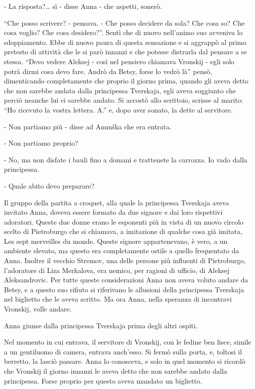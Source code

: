 - La risposta?\ldots{} sì - disse Anna - che aspetti, sonerò. 

``Che posso scrivere? - pensava. - Che posso decidere da sola? Che cosa so? Che cosa voglio? Che cosa desidero?''. Sentì che di nuovo nell'animo suo avveniva lo sdoppiamento. Ebbe di nuovo paura di questa sensazione e si aggrappò al primo pretesto di attività che le si parò innanzi e che potesse distrarla dal pensare a se stessa. ``Devo vedere Aleksej - così nel pensiero chiamava Vronskij - egli solo potrà dirmi cosa devo fare. Andrò da Betsy, forse lo vedrò là'' pensò, dimenticando completamente che proprio il giorno prima, quando gli aveva detto che non sarebbe andata dalla principessa Tverskaja, egli aveva soggiunto che perciò neanche lui ci sarebbe andato. Si accostò allo scrittoio, scrisse al marito: ``Ho ricevuto la vostra lettera. A.'' e, dopo aver sonato, la dette al servitore. 

- Non partiamo più - disse ad Annuška che era entrata. 

- Non partiamo proprio? 

- No, ma non disfate i bauli fino a domani e trattenete la carrozza. Io vado dalla principessa. 

- Quale abito devo preparare? 

\label{xvii-2} 

Il gruppo della partita a croquet, alla quale la principessa Tverskaja aveva invitato Anna, doveva essere formato da due signore e dai loro rispettivi adoratori. Queste due donne erano le esponenti più in vista di un nuovo circolo scelto di Pietroburgo che si chiamava, a imitazione di qualche cosa già imitata, Les sept merveilles du monde. Queste signore appartenevano, è vero, a un ambiente elevato, ma questo era completamente ostile a quello frequentato da Anna. Inoltre il vecchio Stremov, una delle persone più influenti di Pietroburgo, l'adoratore di Liza Merkalova, era nemico, per ragioni di ufficio, di Aleksej Aleksandrovic. Per tutte queste considerazioni Anna non aveva voluto andare da Betsy, e a questo suo rifiuto si riferivano le allusioni della principessa Tverskaja nel biglietto che le aveva scritto. Ma ora Anna, nella speranza di incontravi Vronskij, volle andare. 

Anna giunse dalla principessa Tverskaja prima degli altri ospiti. 

Nel momento in cui entrava, il servitore di Vronskij, con le fedine ben lisce, simile a un gentiluomo di camera, entrava anch'esso. Si fermò sulla porta, e, toltosi il berretto, la lasciò passare. Anna lo conosceva, e solo in quel momento si ricordò che Vronskij il giorno innanzi le aveva detto che non sarebbe andato dalla principessa. Forse proprio per questo aveva mandato un biglietto. 

